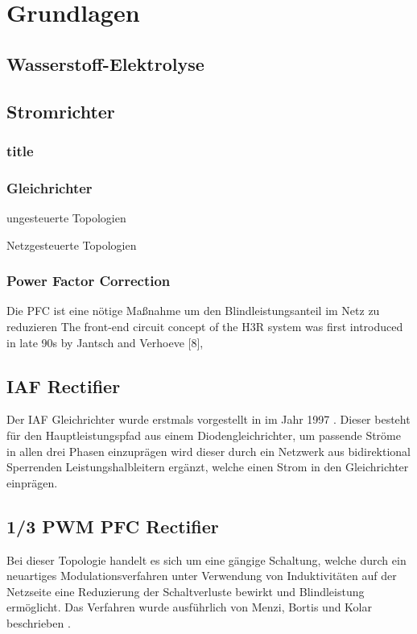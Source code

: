 \chapter{Grundlagen}


\section{Wasserstoff-Elektrolyse}

\section{Stromrichter}
\subsection{title}
\subsection{Gleichrichter}

	ungesteuerte Topologien
	
	Netzgesteuerte Topologien
	
\subsection{Power Factor Correction}
	Die \gls{PFC} ist eine nötige Maßnahme um den Blindleistungsanteil im Netz zu reduzieren 
	The front-end circuit concept of the H3R system was first introduced in late 90s by Jantsch and Verhoeve [8],
	
	
\section{IAF Rectifier}
Der \gls{IAF} Gleichrichter wurde erstmals vorgestellt in \cite{IAFfirst} im Jahr 1997 . Dieser besteht für den Hauptleistungspfad aus einem Diodengleichrichter, um passende Ströme in allen drei Phasen einzuprägen wird dieser durch ein Netzwerk aus bidirektional Sperrenden Leistungshalbleitern ergänzt, welche einen Strom in den Gleichrichter einprägen.

\section{1/3 PWM PFC Rectifier}
Bei dieser Topologie handelt es sich um eine gängige Schaltung, welche durch ein neuartiges Modulationsverfahren unter Verwendung von Induktivitäten auf der Netzseite eine Reduzierung der Schaltverluste bewirkt und Blindleistung ermöglicht. Das Verfahren wurde ausführlich von Menzi, Bortis und Kolar beschrieben \cite{1/3PWMPFC}.
